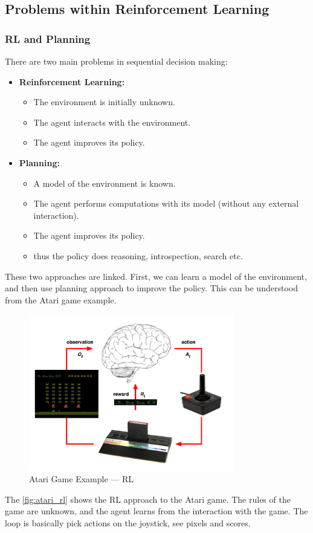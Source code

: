 \subsection{Problems within Reinforcement Learning}
\subsubsection{RL and Planning}
There are two main problems in sequential decision making:
\begin{itemize}
    \item \textbf{Reinforcement Learning:}
    \begin{itemize}
        \item The environment is initially unknown.
        \item The agent interacts with the environment.
        \item The agent improves its policy.   
    \end{itemize}
    \item \textbf{Planning:}
    \begin{itemize}
        \item A model of the environment is known.
        \item The agent performs computations with its model (without any external interaction).
        \item The agent improves its policy.
        \item thus the policy does reasoning, introspection, search etc.
    \end{itemize}
\end{itemize}
These two approaches are linked. First, we can learn a model of the environment, and then use 
planning approach to improve the policy.
This can be understood from the Atari game example.
\begin{figure}[H]
    \centering
    \includegraphics[width=0.8\textwidth]{figures/atari_rl.png}
    \caption{Atari Game Example --- RL}
    \label{fig:atari_rl}
\end{figure}
The \autoref{fig:atari_rl} shows 
the RL approach to the Atari game. The rules of the game are unknown, 
and the agent learns from the interaction with the game. The loop is basically
pick actions on the joystick, see pixels and scores.

